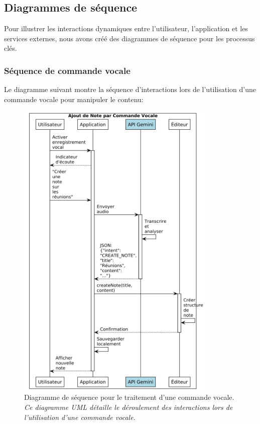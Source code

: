     \subsection{Diagrammes de séquence}
    
    Pour illustrer les interactions dynamiques entre l'utilisateur, l'application et les services externes, nous avons créé des diagrammes de séquence pour les processus clés.
    
    \subsubsection{Séquence de commande vocale}
    
    Le diagramme suivant montre la séquence d'interactions lors de l'utilisation d'une commande vocale pour manipuler le contenu:
    
        \begin{figure}[htbp]
        \centering
        \includegraphics[width=0.85\textwidth]{assets/docs/voicenotion_sequence_voice.png}
        \caption{Diagramme de séquence pour le traitement d'une commande vocale. \newline\textit{Ce diagramme UML détaille le déroulement des interactions lors de l'utilisation d'une commande vocale.}}
        \label{fig:sequence_voice_command}
    \end{figure}
    
